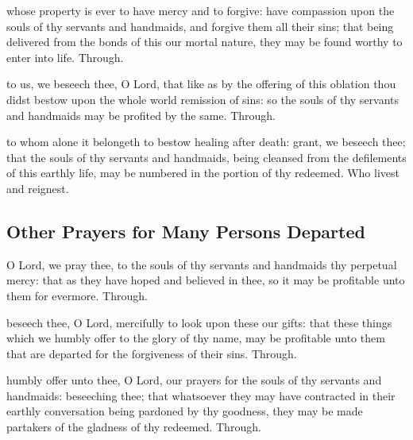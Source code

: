 \begin{multicols}{2}
\collect
{} whose property is ever to have mercy and to forgive: have compassion upon the souls of thy servants and handmaids, and forgive them all their sins; that being delivered from the bonds of this our mortal nature, they may be found worthy to enter into life. Through.

\vspace{-0.25\baselineskip}

\secret
{} to us, we beseech thee, O Lord, that like as by the offering of this oblation thou didst bestow upon the whole world remission of sins: so the souls of thy servants and handmaids may be profited by the same. Through.

\vspace{-0.25\baselineskip}

\postcommunion
{} to whom alone it belongeth to bestow healing after death: grant, we beseech thee; that the souls of thy servants and handmaids, being cleansed from the defilements of this earthly life, may be numbered in the portion of thy redeemed. Who livest and reignest.

\vspace{-0.25\baselineskip}

\subsection{Other Prayers for Many Persons Departed}

\vspace{-0.25\baselineskip}

\collect
{} O Lord, we pray thee, to the souls of thy servants and handmaids thy perpetual mercy: that as they have hoped and believed in thee, so it may be profitable unto them for evermore. Through.

\vspace{-0.25\baselineskip}

\secret
{} beseech thee, O Lord, mercifully to look upon these our gifts: that these things which we humbly offer to the glory of thy name, may be profitable unto them that are departed for the forgiveness of their sins. Through.

\vspace{-0.25\baselineskip}

\postcommunion
{} humbly offer unto thee, O Lord, our prayers for the souls of thy servants and handmaids: beseeching thee; that whatsoever they may have contracted in their earthly conversation being pardoned by thy goodness, they may be made partakers of the gladness of thy redeemed. Through.
\end{multicols}